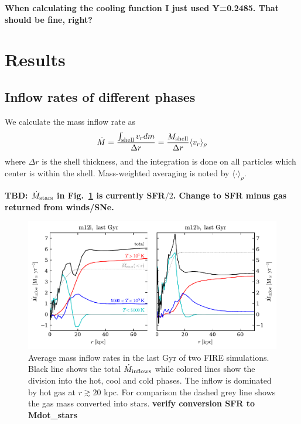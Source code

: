 \documentclass[fleqn,usenatbib]{mnras}
\newcommand{\Mdot}{\dot{M}}
\newcommand{\Rvir}{R_{\rm vir}}
\begin{document}
\textbf{When calculating the cooling function I just used Y=0.2485. That should be fine, right?}

\section{Results}
\subsection{Inflow rates of different phases}
\newcommand{\nH}{n_{\rm H}}

We calculate the mass inflow rate as
\begin{equation}\label{e:Mdot}
     \Mdot = \frac{\int_{\rm shell} v_r dm}{\Delta r} = \frac{M_{\rm shell}}{\Delta r} \langle v_r\rangle_\rho
\end{equation}
where $\Delta r$ is the shell thickness, and the integration is done on all particles which center is within the shell. Mass-weighted averaging is noted by $\langle\cdot\rangle_\rho$.

\textbf{TBD: $\dot{M}_{\rm stars}$ in Fig.~\ref{f:Mdot} is currently SFR$/2$. Change to SFR minus gas returned from winds/SNe.}
    
\begin{figure}
    \centering
    \includegraphics{Mdot.pdf}
    \caption{
    Average mass inflow rates in the last Gyr of two FIRE simulations. Black line shows the total $\dot{M}_{\rm inflows}$  while colored lines show the division into the hot, cool and cold phases. 
    The inflow is dominated by hot gas at $r\gtrsim 20 $ kpc. For comparison the dashed grey line shows the gas mass converted into stars.
    \textbf{verify conversion SFR to Mdot\_stars}
    }
    \label{f:Mdot}
\end{figure}
\end{document}
